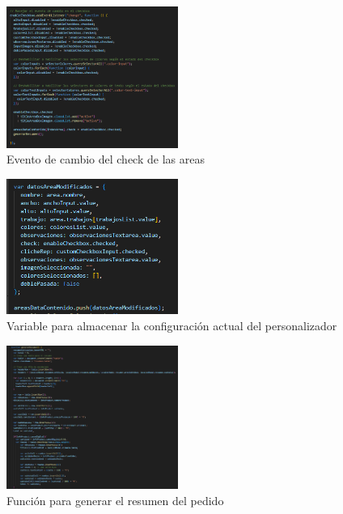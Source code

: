\documentclass[12pt]{article}
\begin{document}
\begin{figure}[ht]
    \centering
    \includegraphics[width=0.5\textwidth]{imagenesUS3-modal/manejoDesabilitarElementos.png}
    \caption{\label{fig:deshabilitarElementos} Evento de cambio del check de las areas}
    \vspace{\fill}
\end{figure}


\begin{figure}[ht]
    \centering
    \includegraphics[width=0.5\textwidth]{imagenesUS3-modal/variableDatosArea.png}
    \caption{\label{fig:variableConfiguracion} Variable para almacenar la configuración actual del personalizador}
    \vspace{\fill}
\end{figure}

\begin{figure}[ht]
    \centering
    \includegraphics[width=0.5\textwidth]{imagenesUS3-modal/generarResumen.png}
    \caption{\label{fig:resumen1} Función para generar el resumen del pedido}
    \vspace{\fill}
\end{figure}
\end{document}
